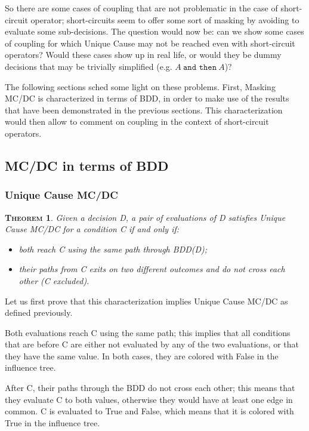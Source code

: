 \documentclass[a4paper,12pt,twoside]{article}
\newcommand{\andthen}{\texttt{and then}}
\newtheorem{theorem}{\textsc{Theorem}}
\begin{document}
So there are some cases of coupling that are not problematic in the case
of short-circuit operator; short-circuits seem to offer some sort of masking
by avoiding to evaluate some sub-decisions. The question would now be:
can we show some cases of coupling for which Unique Cause may not be reached
even with short-circuit operators? Would these cases show up in real life,
or would they be dummy decisions that may be trivially simplified (e.g.
$A \ \andthen{} \ A$)?

The following sections sched some light on these problems. First,
Masking MC/DC is characterized in terms of BDD, in order to make use
of the results that have been demonstrated in the previous sections.
This characterization would then allow to comment on coupling in the
context of short-circuit operators.

\subsection{MC/DC in terms of BDD}

\subsubsection{Unique Cause MC/DC}

\begin{theorem}
  \label{thm:unique-cause-bdd}
  Given a decision D, a pair of evaluations of D satisfies
  Unique Cause MC/DC for a condition C if and only if:
  \begin{itemize}
  \item both reach C using the same path through BDD(D);
  \item their paths from C exits on two different outcomes and do not cross
  each other (C excluded).
  \end{itemize}
\end{theorem}

Let us first prove that this characterization implies Unique Cause MC/DC
as defined previously.

Both evaluations reach C using the same path; this implies that all
conditions that are before C are either not evaluated by any of the
two evaluations, or that they have the same value.  In both cases,
they are colored with False in the influence tree.

After C, their paths through the BDD do not cross each other; this means
that they evaluate C to both values, otherwise they would have at least one
edge in common. C is evaluated to True and False, which means that it is
colored with True in the influence tree.
\end{document}
